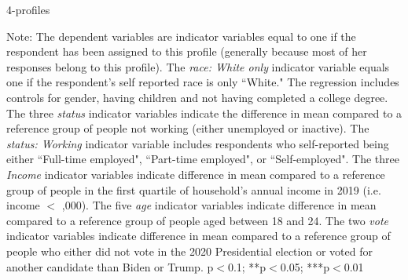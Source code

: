 \documentclass{article}
\begin{document}
\begin{table}[h!]
    \caption{4-profiles}
    \begin{center}
        \scalebox{0.7}{}
    \end{center}
    {\footnotesize Note: The dependent variables are indicator variables equal to one if the respondent has been assigned to this profile (generally because most of her responses belong to this profile). 
    The \textit{race: White only} indicator variable equals one if the respondent's self reported race is only ``White." The regression includes controls for gender, having children and not having completed a college degree. The three \textit{status} indicator variables indicate the difference in mean compared to a reference group of people not working (either unemployed or inactive). The \textit{status: Working} indicator variable includes respondents who self-reported being either ``Full-time employed", ``Part-time employed", or ``Self-employed". The three \textit{Income} indicator variables indicate difference in mean compared to a reference group of people in the first quartile of household's annual income in 2019 (i.e. income $<$ ,000). The five \textit{age} indicator variables indicate difference in mean compared to a reference group of people aged between 18 and 24. The two \textit{vote} indicator variables indicate difference in mean compared to a reference group of people who either did not vote in the 2020 Presidential election or voted for another candidate than Biden or Trump.
    \newline  *p$<$0.1; **p$<$0.05; ***p$<$0.01}
\end{table} 

\clearpage



\begin{spacing}{0.5}


\end{spacing}
\end{document}
